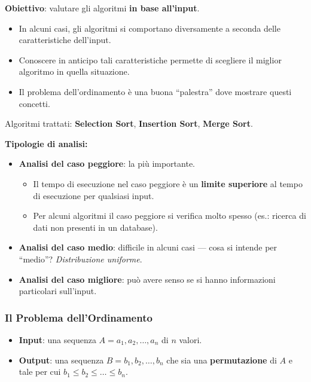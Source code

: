 \documentclass[12pt, a4paper]{article}
\begin{document}
\textbf{Obiettivo}: valutare gli algoritmi \textbf{in base all'input}.
\begin{itemize}
    \item In alcuni casi, gli algoritmi si comportano diversamente a seconda delle caratteristiche dell'input.
    \item Conoscere in anticipo tali caratteristiche permette di scegliere il miglior algoritmo in quella situazione.
    \item Il problema dell'ordinamento è una buona ``palestra'' dove mostrare questi concetti.
\end{itemize}
Algoritmi trattati: \textbf{Selection Sort}, \textbf{Insertion Sort}, \textbf{Merge Sort}.

\textbf{Tipologie di analisi:}
\begin{itemize}
    \item \textcolor{red!70!black}{\textbf{Analisi del caso peggiore}}: la più importante.
    \begin{itemize}
        \item Il tempo di esecuzione nel caso peggiore è un \textbf{limite superiore} al tempo di esecuzione per qualsiasi input.
        \item Per alcuni algoritmi il caso peggiore si verifica molto spesso (es.: ricerca di dati non presenti in un database).
    \end{itemize}
    \item \textcolor{orange!80!black}{\textbf{Analisi del caso medio}}: difficile in alcuni casi --- cosa si intende per ``medio''? \textit{Distribuzione uniforme}.
    \item \textcolor{green!50!black}{\textbf{Analisi del caso migliore}}: può avere senso se si hanno informazioni particolari sull'input.
\end{itemize}

\subsubsection{Il Problema dell'Ordinamento}

\begin{tcolorbox}[colback=lightergray!10, colframe=tocsec, title=\textbf{Definizione: Problema dell'Ordinamento}]
\label{def:problema-ordinamento}
\begin{itemize}
    \item \textbf{Input}: una sequenza $A = a_1, a_2, \ldots, a_n$ di $n$ valori.
    \item \textbf{Output}: una sequenza $B = b_1, b_2, \ldots, b_n$ che sia una \textbf{permutazione} di $A$ e tale per cui $b_1 \le b_2 \le \ldots \le b_n$.
\end{itemize}
\end{tcolorbox}
\end{document}
